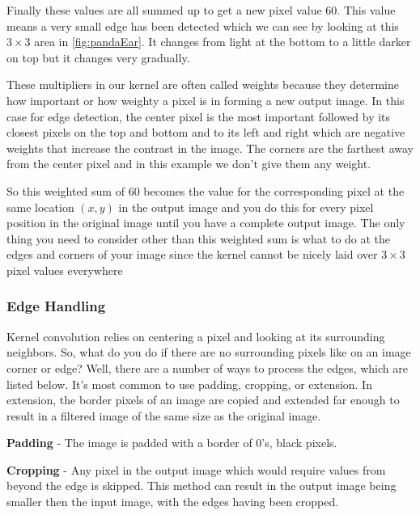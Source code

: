  Finally these values are all summed up to get a new pixel value 60. This value means a very small edge has been detected which we can see by looking at this \(3 \times 3\) area in \autoref{fig:pandaEar}. It changes from light at the bottom to a little darker on top but it changes very gradually. \newline
 
 These multipliers in our kernel are often called weights because they determine how important or how weighty a pixel is in forming a new output image. In this case for edge detection, the center pixel is the most important followed by its closest pixels on the top and bottom and to its left and right which are negative weights that increase the contrast in the image. The corners are the farthest away from the center pixel and in this example we don't give them any weight. \newline
 
 So this weighted sum of 60 becomes the value for the corresponding pixel at the same location \((x, y)\) in the output image and you do this for every pixel position in the original image until you have a complete output image. The only thing you need to consider other than this weighted sum is what to do at the edges and corners of your image since the kernel cannot be nicely laid over \(3 \times 3\) pixel values everywhere

\subsubsection{Edge Handling}

Kernel convolution relies on centering a pixel and looking at its surrounding neighbors. So, what do you do if there are no surrounding pixels like on an image corner or edge? Well, there are a number of ways to process the edges, which are listed below. It’s most common to use padding, cropping, or extension. In extension, the border pixels of an image are copied and extended far enough to result in a filtered image of the same size as the original image.\newline

\textbf{Padding} - The image is padded with a border of 0's, black pixels.\newline

\textbf{Cropping} - Any pixel in the output image which would require values from beyond the edge is skipped. This method can result in the output image being smaller then the input image, with the edges having been cropped.\newline

